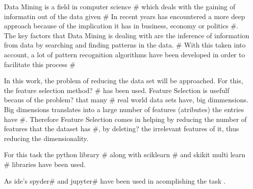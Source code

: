 
Data Mining is a field in computer science # which deals with the gaining of informatin out of the data given # In recent years has encountered a more deep approach because of the implication it has in business, economy or politics #. The key factors that Data Mining is dealing with are the inference of information from data by searching and finding patterns in the data. # With this taken into account, a lot of pattern recognition algorithms have been developed in order to facilitate this process #

In this work, the problem of reducing the data set will be approached. For this, the feature selection method? # has been used. Feature Selection is usefulf becaus of the problem? that many # real world data sets have, big dimmensions. Big dimensions translates into a large number of features (atributes) the entries have #. Therefore Feature Selection comes in helping by reducing the number of features that the dataset has #, by deleting? the irrelevant features of it, thus reducing the dimensionality.

For this task the python library # along with sciklearn # and skikit multi learn # libraries have been used.

As ide's spyder# and jupyter# have been used in acomplishing the task  .